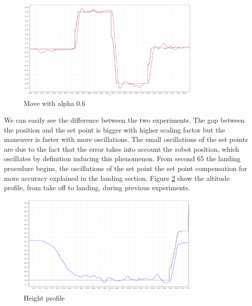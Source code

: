 \begin{figure}[h]
\centering
 \includegraphics[width=0.8\textwidth]{xalpha06.png}
 \caption{Move with alpha 0.6}
 \label{figure:xalpha06}
\end{figure}
We can easily see the difference between the two experiments. The gap between the position and the set point is bigger with higher scaling factor but the maneuver is faster with more oscillations. The small oscillations of the  set points are due to the fact that the error takes into account the robot position, which oscillates by definition inducing this phenomenon. From second 65 the landing procedure begins, the oscillations of the set point the set point compensation for more accuracy explained in the landing section. Figure \ref{figure:takeland} show the altitude profile, from take off to landing, during previous experiments. 

\begin{figure}[h]
\centering
 \includegraphics[width=0.8\textwidth]{takeland.png}
 \caption{Height profile}
 \label{figure:takeland}
\end{figure}


